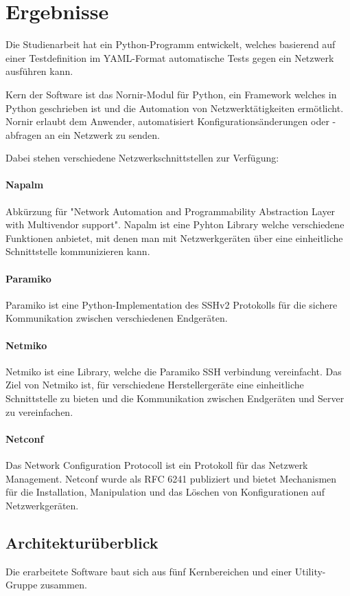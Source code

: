 \documentclass[]{subfiles}
\begin{document}
\section{Ergebnisse}
Die Studienarbeit hat ein Python-Programm entwickelt, welches basierend auf einer Testdefinition
im YAML-Format automatische Tests gegen ein Netzwerk ausführen kann.

Kern der Software ist das Nornir-Modul für Python, ein Framework welches in Python geschrieben
ist und die Automation von Netzwerktätigkeiten ermötlicht. 
Nornir erlaubt dem Anwender, automatisiert Konfigurationsänderungen oder -abfragen an ein 
Netzwerk zu senden.

Dabei stehen verschiedene Netzwerkschnittstellen zur Verfügung:
\paragraph{Napalm}
Abkürzung für "Network Automation and Programmability Abstraction Layer with Multivendor support".
Napalm ist eine Pyhton Library welche verschiedene Funktionen anbietet, mit denen man 
mit Netzwerkgeräten über eine einheitliche Schnittstelle kommunizieren kann.

\paragraph{Paramiko}
Paramiko ist eine Python-Implementation des SSHv2 Protokolls für die sichere Kommunikation
zwischen verschiedenen Endgeräten.

\paragraph{Netmiko}
Netmiko ist eine Library, welche die Paramiko SSH verbindung vereinfacht. 
Das Ziel von Netmiko ist, für verschiedene Herstellergeräte eine einheitliche Schnittstelle
zu bieten und die Kommunikation zwischen Endgeräten und Server zu vereinfachen.

\paragraph{Netconf}
Das Network Configuration Protocoll ist ein Protokoll für das Netzwerk Management.
Netconf wurde als RFC 6241 publiziert und bietet Mechanismen für die Installation,
Manipulation und das Löschen von Konfigurationen auf Netzwerkgeräten.

\newpage

\subsection{Architekturüberblick}
Die erarbeitete Software baut sich aus fünf Kernbereichen und einer Utility-Gruppe zusammen.
\end{document}
